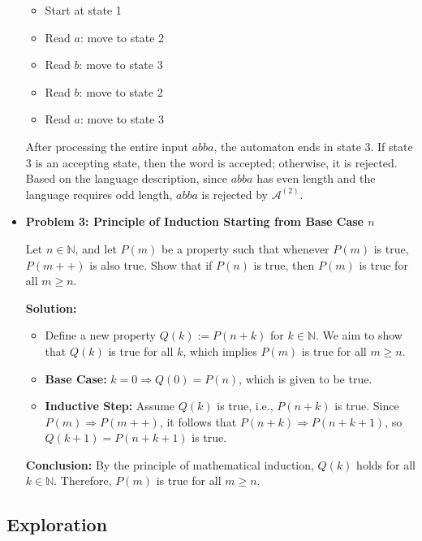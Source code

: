 \documentclass[11pt]{article}
\begin{document}
\begin{itemize}[leftmargin=*]
\begin{itemize}
    \item Start at state 1
    \item Read \( a \): move to state 2
    \item Read \( b \): move to state 3
    \item Read \( b \): move to state 2
    \item Read \( a \): move to state 3
\end{itemize}

After processing the entire input \( abba \), the automaton ends in state 3. If state 3 is an accepting state, then the word is accepted; otherwise, it is rejected. Based on the language description, since \( abba \) has even length and the language requires odd length, \( abba \) is rejected by \( \mathcal{A}^{(2)} \).

\item \textbf{Problem 3: Principle of Induction Starting from Base Case \( n \)}

Let \( n \in \mathbb{N} \), and let \( P(m) \) be a property such that whenever \( P(m) \) is true, \( P(m++) \) is also true. Show that if \( P(n) \) is true, then \( P(m) \) is true for all \( m \geq n \).

\textbf{Solution:}

\begin{itemize}
    \item Define a new property \( Q(k) := P(n + k) \) for \( k \in \mathbb{N} \). We aim to show that \( Q(k) \) is true for all \( k \), which implies \( P(m) \) is true for all \( m \geq n \).
    
    \item \textbf{Base Case:} \( k = 0 \Rightarrow Q(0) = P(n) \), which is given to be true.
    
    \item \textbf{Inductive Step:} Assume \( Q(k) \) is true, i.e., \( P(n + k) \) is true. Since \( P(m) \Rightarrow P(m++) \), it follows that \( P(n + k) \Rightarrow P(n + k + 1) \), so \( Q(k+1) = P(n + k + 1) \) is true.
\end{itemize}

\textbf{Conclusion:}  
By the principle of mathematical induction, \( Q(k) \) holds for all \( k \in \mathbb{N} \). Therefore, \( P(m) \) is true for all \( m \geq n \).

\end{itemize}

\subsection{Exploration}
\end{document}
